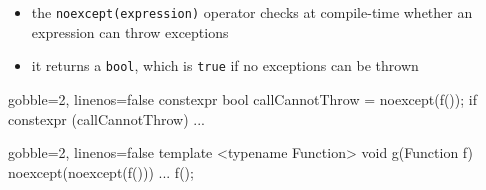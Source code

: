 \begin{advanced}
\begin{frame}[fragile]
  \begin{block}{}
    \begin{itemize}
      \item the \texttt{noexcept(expression)} operator checks at compile-time whether an expression can throw exceptions
      \item it returns a \texttt{bool}, which is \texttt{true} if no exceptions can be thrown
    \end{itemize}
  \end{block}
  \begin{block}{}
    \begin{cppcode*}{gobble=2, linenos=false}
      constexpr bool callCannotThrow = noexcept(f());
      if constexpr (callCannotThrow) { ... }
    \end{cppcode*}
  \end{block}
  \begin{block}{}
    \begin{cppcode*}{gobble=2, linenos=false}
      template <typename Function>
      void g(Function f) noexcept(noexcept(f())) {
        ...
        f();
      }
    \end{cppcode*}
  \end{block}
\end{frame}


\end{advanced}
